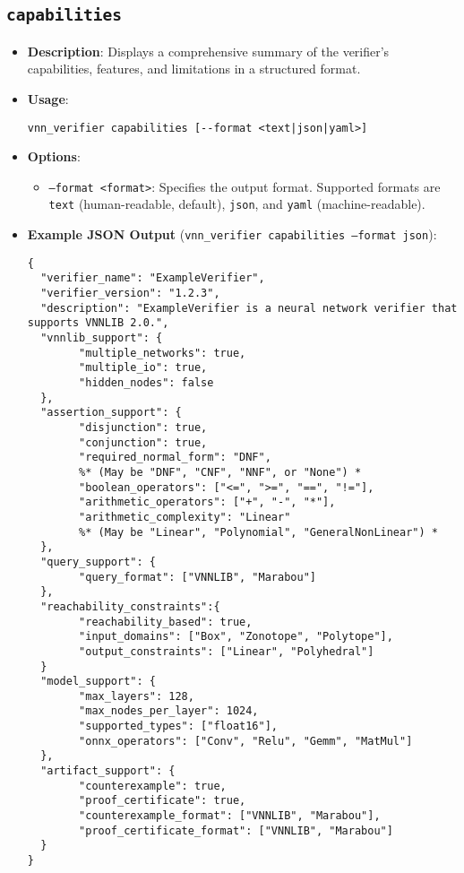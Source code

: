 \subsection{\texttt{capabilities}}
\begin{itemize}
    \item \textbf{Description}: Displays a comprehensive summary of the verifier's capabilities, features, and limitations in a structured format.
    \item \textbf{Usage}:
    \begin{lstlisting}[style=bash]
vnn_verifier capabilities [--format <text|json|yaml>] \end{lstlisting}
    \item \textbf{Options}:
    \begin{itemize}
        \item \texttt{--format <format>}: Specifies the output format. Supported formats are \texttt{text} (human-readable, default), \texttt{json}, and \texttt{yaml} (machine-readable).
    \end{itemize}
    \item \textbf{Example JSON Output} (\texttt{vnn\_verifier capabilities --format json}):
    \begin{lstlisting}[style=bash, caption=Example JSON output for capabilities command]
{
  "verifier_name": "ExampleVerifier",
  "verifier_version": "1.2.3",
  "description": "ExampleVerifier is a neural network verifier that supports VNNLIB 2.0.",
  "vnnlib_support": {
		"multiple_networks": true,
		"multiple_io": true,
		"hidden_nodes": false
  },
  "assertion_support": {
		"disjunction": true,
		"conjunction": true,
		"required_normal_form": "DNF",
		%* (May be "DNF", "CNF", "NNF", or "None") *
		"boolean_operators": ["<=", ">=", "==", "!="],
		"arithmetic_operators": ["+", "-", "*"],
		"arithmetic_complexity": "Linear"
		%* (May be "Linear", "Polynomial", "GeneralNonLinear") *
  },
  "query_support": {
    	"query_format": ["VNNLIB", "Marabou"]
  },
  "reachability_constraints":{
		"reachability_based": true,
		"input_domains": ["Box", "Zonotope", "Polytope"],
		"output_constraints": ["Linear", "Polyhedral"]
  }
  "model_support": {
		"max_layers": 128,
		"max_nodes_per_layer": 1024,
		"supported_types": ["float16"],
		"onnx_operators": ["Conv", "Relu", "Gemm", "MatMul"]
  },
  "artifact_support": {
		"counterexample": true,
		"proof_certificate": true,
		"counterexample_format": ["VNNLIB", "Marabou"],
		"proof_certificate_format": ["VNNLIB", "Marabou"]
  }
}
    \end{lstlisting}
\end{itemize}

